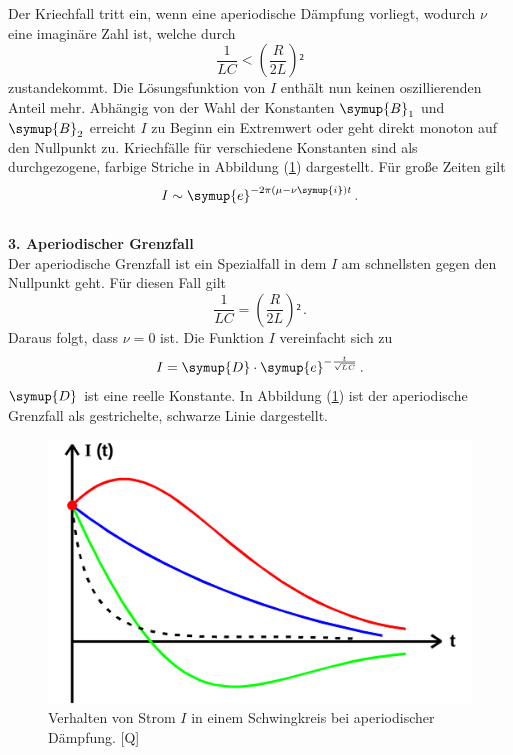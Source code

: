 Der Kriechfall tritt ein, wenn eine aperiodische Dämpfung vorliegt, wodurch
 $\nu$ eine imaginäre Zahl ist, welche durch 
\begin{equation*}
    \frac{1}{LC} < \left(\frac{R}{2L}\right)² 
\end{equation*}
zustandekommt. Die Lösungsfunktion von $I$ enthält nun keinen oszillierenden Anteil mehr. 
Abhängig von der Wahl der Konstanten $\symup{B}_1$ und $\symup{B}_2$ erreicht $I$ zu Beginn ein Extremwert 
oder geht direkt monoton auf den Nullpunkt zu. Kriechfälle für verschiedene Konstanten 
sind als durchgezogene, farbige Striche in Abbildung (\ref{pic:aperiodische_Daempfung})
dargestellt. 
Für große Zeiten gilt
\begin{equation*}
    I \sim \symup{e}^{- 2\pi \left(\mu - \nu \symup{i}\right)t}\, . 
\end{equation*}
 \\
\textbf{3. Aperiodischer Grenzfall}\\
Der aperiodische Grenzfall ist ein Spezialfall in dem $I$ am schnellsten gegen den 
Nullpunkt geht. 
Für diesen Fall gilt 
\begin{equation}
    \frac{1}{LC} = \left(\frac{R}{2L}\right)² \, .
    \label{eqn:aperiodischerGrenzfall}
\end{equation}
Daraus folgt, dass $\nu = 0$ ist. Die Funktion $I$ vereinfacht sich zu
\begin{equation*}
    I = \symup{D} \cdot \symup{e}^{- \frac{t}{\sqrt{L C}}} \, .
\end{equation*} 
$\symup{D}$ ist eine reelle Konstante. In Abbildung (\ref{pic:aperiodische_Daempfung})
ist der aperiodische Grenzfall als gestrichelte, schwarze Linie dargestellt. 

\begin{figure}[H]
    \centering
    \includegraphics[width=0.7\linewidth]{Aperiodische_Daempfung_Abbildung.png}
    \caption{Verhalten von Strom $I$ in einem Schwingkreis bei aperiodischer Dämpfung. [Q\cite{anleitungV354}]}
    \label{pic:aperiodische_Daempfung}
\end{figure}

